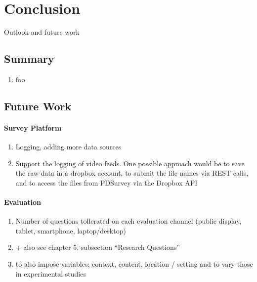\section{Conclusion}
\label{sec:conclusion}

Outlook and future work



\subsection{Summary}

\begin{enumerate}
\item foo
\end{enumerate}


\subsection{Future Work}


\paragraph{Survey Platform}

	\begin{enumerate}
	\item Logging, adding more data sources
	\item Support the logging of video feeds. One possible approach would be to save the raw data in a dropbox account, to submit the file names via REST calls, and to access the files from PDSurvey via the Dropbox API
	\end{enumerate}


\paragraph{Evaluation}

	\begin{enumerate}
	\item Number of questions tollerated on each evaluation channel (public display, tablet, smartphone, laptop/desktop)
	\item + also see chapter 5, subsection ``Research Questions'' 
	\item to also impose variables: context, content, location / setting and to vary those in experimental studies
	\end{enumerate}

